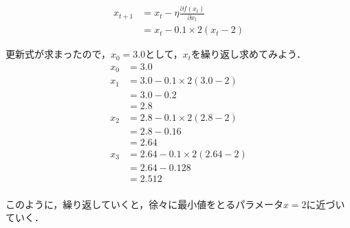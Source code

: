 \documentclass[12pt]{jsarticle}
\begin{document}
\begin{align*}
  x_{t+1} &= x_{t} - \eta \frac{\partial f(x_{t})}{\partial x_{t}} \\
  &= x_t - 0.1\times 2(x_t-2)
\end{align*}
\label{eq:gdm2}

更新式が求まったので，$x_0=3.0$として，$x_t$を繰り返し求めてみよう．
\begin{align*}
  x_0 &= 3.0 \\
  x_1 &= 3.0 - 0.1\times 2(3.0-2) \\
      &= 3.0 - 0.2 \\
      &= 2.8 \\
  x_2 &= 2.8 - 0.1\times 2(2.8-2) \\
      &= 2.8 - 0.16 \\
      &= 2.64 \\
  x_3 &= 2.64 - 0.1\times 2(2.64-2) \\
      &= 2.64 - 0.128 \\
      &= 2.512 \\
\end{align*}

このように，繰り返していくと，徐々に最小値をとるパラメータ$x=2$に近づいていく．
\end{document}
